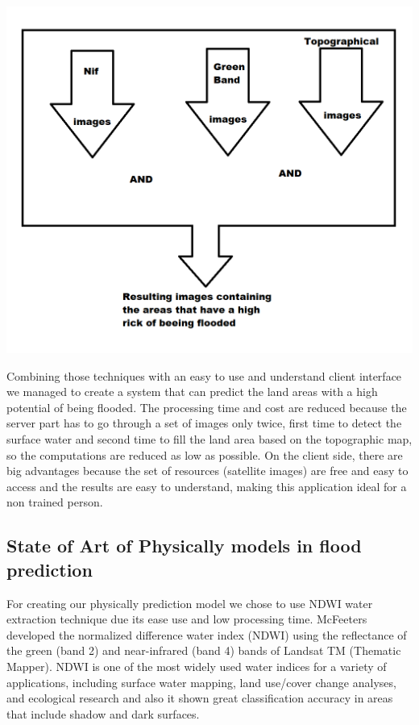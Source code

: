 \documentclass[12pt, a4paper]{report}
\begin{document}
\begin{center}
	\includegraphics[scale=0.6]{application_outline.png} 
\end{center}

Combining those techniques with an easy to use and understand client interface we managed to create a system that can predict the land areas with a high potential of being flooded. The processing time and cost are reduced because the server part has to go through a set of images only twice, first time to detect the surface water and second time to fill the land area based on the topographic map, so the computations are reduced as low as possible. On the client side, there are big advantages because the set of resources (satellite images) are free and easy to access and the results are easy to understand, making this application ideal for a non trained person.
\par





\subsection{State of Art of Physically models in flood prediction}

\quad
For creating our physically prediction model we chose to use NDWI water extraction technique due its ease use and low processing time. McFeeters \cite{16} developed the normalized difference water index (NDWI) using the reflectance of the green (band 2) and near-infrared (band 4) bands of Landsat TM (Thematic Mapper). NDWI is one of the most widely used water indices for a variety of applications, including surface water mapping, land use/cover change analyses, and ecological research\cite{17-19} and also it shown great classification accuracy in areas that include shadow and dark surfaces.
\end{document}
